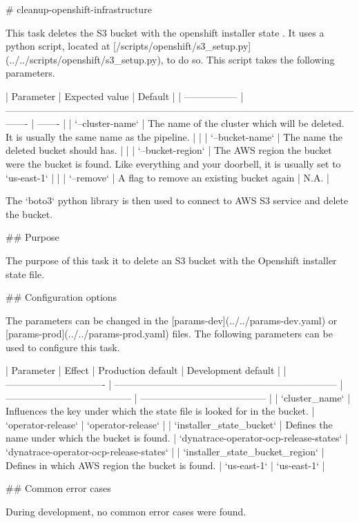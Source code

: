 # cleanup-openshift-infrastructure

This task deletes the S3 bucket with the openshift installer state .
It uses a python script, located at [/scripts/openshift/s3_setup.py](../../scripts/openshift/s3_setup.py), to do so.
This script takes the following parameters.

| Parameter         | Expected value                                                                                                      | Default |
| ----------------- | ------------------------------------------------------------------------------------------------------------------- | ------- |
| `--cluster-name`  | The name of the cluster which will be deleted. It is usually the same name as the pipeline.                         |         |
| `--bucket-name`   | The name the deleted bucket should has.                                                                            |         |
| `--bucket-region` | The AWS region the bucket were the bucket is found. Like everything and your doorbell, it is usually set to `us-east-1` |         |
| `--remove`        | A flag to remove an existing bucket again                                                                           | N.A.    |

The `boto3` python library is then used to connect to AWS S3 service and delete the bucket.

## Purpose

The purpose of this task it to delete an S3 bucket with the Openshift installer state file.

## Configuration options

The parameters can be changed in the [params-dev](../../params-dev.yaml) or [params-prod](../../params-prod.yaml) files.
The following parameters can be used to configure this task.

| Parameter                       | Effect                                                                | Production default                      | Development default                     |
| ------------------------------- | --------------------------------------------------------------------- | --------------------------------------- | --------------------------------------- |
| `cluster_name`                  | Influences the key under which the state file is looked for in the bucket. | `operator-release`                      | `operator-release`                      |
| `installer_state_bucket`        | Defines the name under which the bucket is found.                   | `dynatrace-operator-ocp-release-states` | `dynatrace-operator-ocp-release-states` |
| `installer_state_bucket_region` | Defines in which AWS region the bucket is found.                    | `us-east-1`                             | `us-east-1`                             |

## Common error cases

During development, no common error cases were found.
